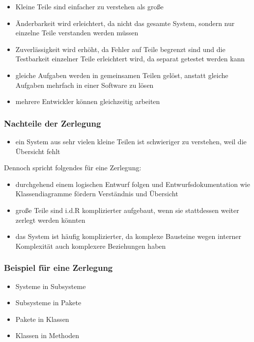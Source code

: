 \begin{itemize}
    \item Kleine Teile sind einfacher zu verstehen als große
    \item Änderbarkeit wird erleichtert, da nicht das gesamte System, sondern nur einzelne Teile verstanden werden müssen
    \item Zuverlässigkeit wird erhöht, da Fehler auf Teile begrenzt sind und die Testbarkeit einzelner Teile erleichtert wird, da separat getestet werden kann
    \item gleiche Aufgaben werden in gemeinsamen Teilen gelöst, anstatt gleiche Aufgaben mehrfach in einer Software zu lösen
    \item mehrere Entwickler können gleichzeitig arbeiten
\end{itemize}

\subsubsection*{Nachteile der Zerlegung}
\begin{itemize}
    \item ein System aus sehr vielen kleine Teilen ist schwieriger zu verstehen, weil die Übersicht fehlt
\end{itemize}

\noindent
Dennoch spricht folgendes für eine Zerlegung:

\begin{itemize}
    \item durchgehend einem logischen Entwurf folgen und Entwurfsdokumentation wie Klassendiagramme fördern Verständnis und Übersicht
    \item große Teile sind i.d.R komplizierter aufgebaut, wenn sie stattdessen weiter zerlegt werden könnten
    \item das System ist häufig komplizierter, da komplexe Bausteine wegen interner Komplexität auch komplexere Beziehungen haben
\end{itemize}

\subsubsection*{Beispiel für eine Zerlegung}
\begin{itemize}
    \item Systeme in Subsysteme
    \item Subsysteme in Pakete
    \item Pakete in Klassen
    \item Klassen in Methoden
\end{itemize}


